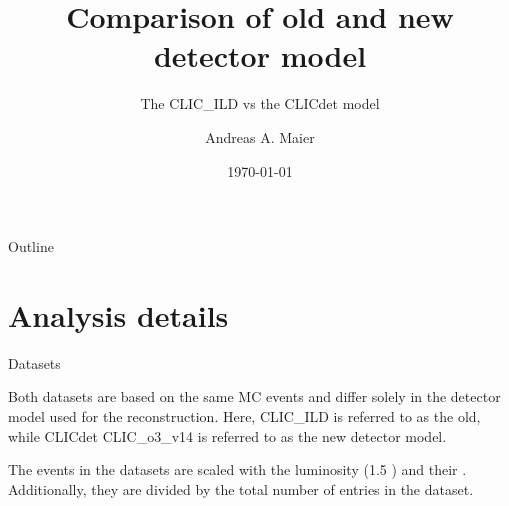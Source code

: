 \documentclass{beamer}
\title{Comparison of old and new detector model}
\subtitle{The CLIC\_ILD vs the CLICdet model}
\author{Andreas A. Maier\inst{1}}
\institute[CERN] %
{
  \inst{1}%
  CERN
}
\date{\today}
\newcommand{\texpath}{../analysis/tex/}
\begin{document}
\begin{frame}
  \titlepage
\end{frame}


















\begin{frame}{Outline}
  \begin{multicols}{2}
    \tableofcontents
  \end{multicols}
\end{frame}









\section{Analysis details}

\begin{frame}{Datasets}

\vspace{-0.5cm}
Both datasets are based on the same MC events and differ solely in the detector model used for the reconstruction.
%
Here, CLIC\_ILD is referred to as the old, while CLICdet CLIC\_o3\_v14 is referred to as the new detector model.

The events in the datasets are scaled with the luminosity (1.5 \invab) and their \xsec.
%
Additionally, they are divided by the total number of entries in the dataset.

\end{frame}
\end{document}
